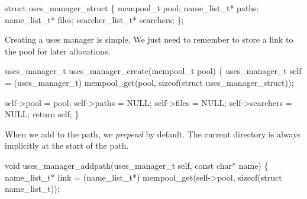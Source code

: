 \nwenddocs{}\plusendmoddef\nwstartdeflinemarkup{}\nwenddeflinemarkup
struct uses_manager_struct \{
    mempool_t pool;
    name_list_t* paths;
    name_list_t* files;
    searcher_list_t* searchers;
\};

\nwendcode{}\nwdocspar

Creating a uses manager is simple.  We just need to remember to store
a link to the pool for later allocations.

\nwenddocs{}\endmoddef\nwstartdeflinemarkup{}\nwenddeflinemarkup
uses_manager_t uses_manager_create(mempool_t pool)
\{
    uses_manager_t self = (uses_manager_t) 
        mempool_get(pool, sizeof(struct uses_manager_struct));

    self->pool = pool;
    self->paths = NULL;
    self->files = NULL;
    self->searchers = NULL;
    return self;
\}

\nwendcode{}\nwdocspar

When we add to the path, we \emph{prepend} by default.  The current
directory is always implicitly at the start of the path.

\nwenddocs{}\plusendmoddef\nwstartdeflinemarkup{}\nwenddeflinemarkup
void uses_manager_addpath(uses_manager_t self, const char* name)
\{
    name_list_t* link = (name_list_t*)
        mempool_get(self->pool, sizeof(struct name_list_t));

